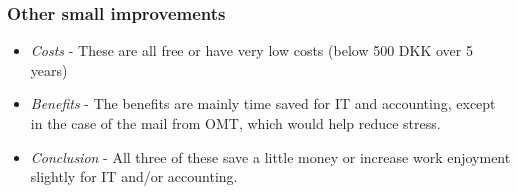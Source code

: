 \subsubsection{Other small improvements}
\begin{itemize}
	\item \emph{Costs} - These are all free or have very low costs (below 500 DKK over 5 years)
	\item \emph{Benefits} - The benefits are mainly time saved for IT and accounting, except in the case of the mail from OMT, which would help reduce stress.
	\item \emph{Conclusion} - All three of these save a little money or increase work enjoyment slightly for IT and/or accounting.
\end{itemize}